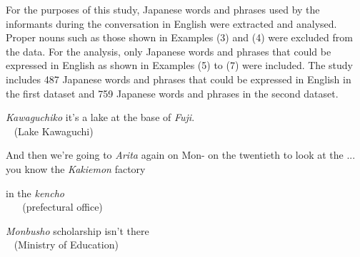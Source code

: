 \documentclass[output=paper]{LSP/langsci}
\begin{document}
For the purposes of this study, Japanese words and phrases used by the informants during the conversation in English were extracted and analysed. Proper nouns such as those shown in Examples (3) and (4) were excluded from the data. For the analysis, only Japanese words and phrases that could be expressed in English as shown in Examples (5) to (7) were included. The study includes 487 Japanese words and phrases that could be expressed in English in the first dataset and 759 Japanese words and phrases in the second dataset.


\ea
{} {\textit{Kawaguchiko}} it's a lake at the base of \textit{Fuji}.\\
{~} {(Lake Kawaguchi)} {~}\\
\z

\begin{exe}
\label{ex:4}
\ex And then we're going to \textit{Arita} again on Mon- on the twentieth to look at the ... you know the \textit{Kakiemon} factory
\end{exe}


\ea
{} {in the} {\textit{kencho}}\\
{~} {~} {(prefectural office)}\\
\z


\ea
{} {\textit{Monbusho}} {scholarship isn't there}\\
{~} {(Ministry of Education)} {~}\\
\z

\end{document}
